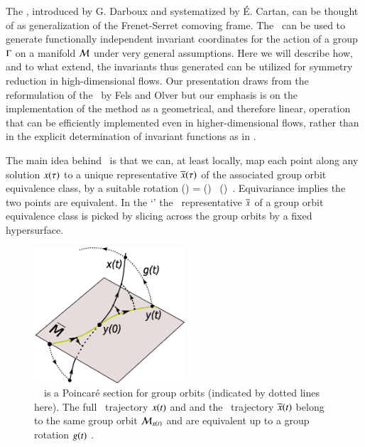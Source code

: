 
The \mframes, introduced by G. Darboux and systematized by \'E. Cartan,
can be thought of as generalization of the Frenet-Serret comoving frame.
The \Mframes\ can be used to generate functionally independent invariant coordinates
for the action of a group $\Gamma$ on a manifold ${\cal M}$ under
very general assumptions.  Here we will describe how, and to what extend,
the invariants thus generated can be utilized for symmetry reduction in
high-dimensional flows. Our presentation draws from the reformulation of the \mframes\
by Fels and Olver but our emphasis is on the implementation
of the method as a geometrical, and therefore linear, operation that can be efficiently
implemented even in higher-dimensional flows, rather than in the explicit
determination of invariant functions as in .

The main idea behind \mframes\ is that we can, at least locally,
map each point along any solution $x(\tau)$ to a unique
representative $\overline{x}(\tau)$ of the associated
group orbit equivalence class, by a suitable rotation
\beq
\ssp(\tau) = \LieEl(\tau) \, \sspRed(\tau)
\,.
Equivariance implies the two points are equivalent.
In the `\mframes' the \reducedsp\ representative $\overline{x}$
of a group orbit equivalence class is picked by slicing across the group orbits
by a fixed hypersurface.
%
\begin{figure}[h]
\begin{center}
 \includegraphics[width=0.5\textwidth]{../Fig/ReducTraj1}
\end{center}
\label{fig:ReducTraj}
\caption{
\Slice\ \pSRed\ is a Poincar\'e section  for
group orbits (indicated by dotted lines here). The full
\statesp\ trajectory $x(t)$ and and the \reducedsp\
trajectory $\overline{x}(t)$ belong to the same group orbit
${\cal M}_{x(t)}$ and are equivalent up to a group rotation
$g(t)$ \refeq{EquiTraj}.
}
\end{figure}
%

